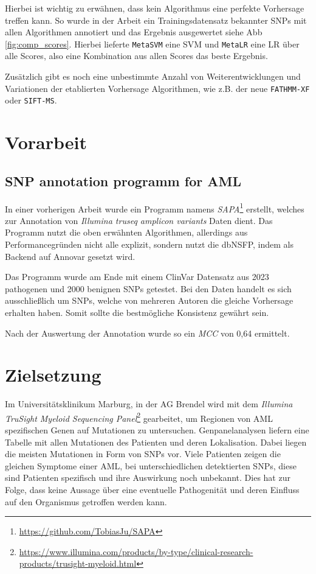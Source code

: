 Hierbei ist wichtig zu erwähnen, dass kein Algorithmus eine perfekte Vorhersage treffen kann. So wurde in der Arbeit \cite{Liu.2016} ein Trainingsdatensatz bekannter SNPs mit allen Algorithmen annotiert und das Ergebnis ausgewertet siehe \ac{Abb} \ref{fig:comp_scores}. Hierbei lieferte \texttt{MetaSVM} eine \ac{SVM} und \texttt{MetaLR} eine \ac{LR} über alle Scores, also eine Kombination aus allen Scores das beste Ergebnis.


Zusätzlich gibt es noch eine unbestimmte Anzahl von Weiterentwicklungen und Variationen der etablierten Vorhersage Algorithmen, wie z.B. der neue \texttt{FATHMM-XF}\cite{Rogers.2017} oder \texttt{SIFT-MS}\cite{Smith.2015}.



\section{Vorarbeit}
\subsection{SNP annotation programm for AML}
\label{sec:sapa}
In einer vorherigen Arbeit wurde ein Programm namens \emph{SAPA}\footnote{\url{https://github.com/TobiasJu/SAPA}} erstellt, welches zur Annotation von \emph{Illumina truseq amplicon variants} Daten dient. Das Programm nutzt die oben erwähnten Algorithmen, allerdings aus Performancegründen nicht alle explizit, sondern nutzt die dbNSFP\cite{Liu.2016}, indem als Backend auf Annovar\cite{Wang.2010} gesetzt wird. 

Das Programm wurde am Ende mit einem ClinVar Datensatz aus 2023 pathogenen und 2000 benignen \ac{SNP}s getestet. Bei den Daten handelt es sich ausschließlich um \ac{SNP}s, welche von mehreren Autoren die gleiche Vorhersage erhalten haben. Somit sollte die bestmögliche Konsistenz gewährt sein.

Nach der Auswertung der Annotation wurde so ein \emph{MCC} von 0,64 ermittelt.


\section{Zielsetzung}

Im Universitätsklinikum Marburg, in der AG Brendel wird mit dem \emph{Illumina TruSight Myeloid Sequencing Panel}\footnote{\url{https://www.illumina.com/products/by-type/clinical-research-products/trusight-myeloid.html}} gearbeitet, um Regionen von \ac{AML} spezifischen Genen auf Mutationen zu untersuchen. Genpanelanalysen liefern eine Tabelle mit allen Mutationen des Patienten und deren Lokalisation. Dabei liegen die meisten Mutationen in Form von \ac{SNP}s vor. Viele Patienten zeigen die gleichen Symptome einer \ac{AML}, bei unterschiedlichen detektierten \ac{SNP}s, diese sind Patienten spezifisch und ihre Auswirkung noch unbekannt. Dies hat zur Folge, dass keine Aussage über eine eventuelle Pathogenität und deren Einfluss auf den Organismus getroffen werden kann.

